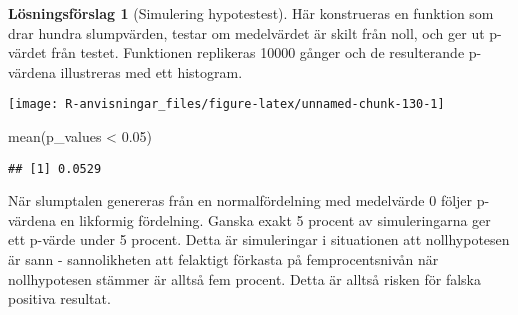 \documentclass[
]{book}
\newenvironment{Shaded}{\begin{snugshade}}{\end{snugshade}}
\newcommand{\AttributeTok}[1]{\textcolor[rgb]{0.77,0.63,0.00}{#1}}
\newcommand{\ControlFlowTok}[1]{\textcolor[rgb]{0.13,0.29,0.53}{\textbf{#1}}}
\newcommand{\DecValTok}[1]{\textcolor[rgb]{0.00,0.00,0.81}{#1}}
\newcommand{\FloatTok}[1]{\textcolor[rgb]{0.00,0.00,0.81}{#1}}
\newcommand{\FunctionTok}[1]{\textcolor[rgb]{0.00,0.00,0.00}{#1}}
\newcommand{\NormalTok}[1]{#1}
\newcommand{\OtherTok}[1]{\textcolor[rgb]{0.56,0.35,0.01}{#1}}
\newcommand{\SpecialCharTok}[1]{\textcolor[rgb]{0.00,0.00,0.00}{#1}}
\theoremstyle{definition}
\theoremstyle{definition}
\theoremstyle{definition}
\theoremstyle{definition}
\newtheorem{hypothesis}{Lösningsförslag}[chapter]
\theoremstyle{remark}
\begin{document}
\begin{hypothesis}[Simulering hypotestest]
Här konstrueras en funktion som drar hundra slumpvärden, testar om medelvärdet är skilt från noll, och ger ut p-värdet från testet. Funktionen replikeras 10000 gånger och de resulterande p-värdena illustreras med ett histogram.

\begin{Shaded}
\end{Shaded}

\begin{center}\texttt{[image: R-anvisningar\_files/figure-latex/unnamed-chunk-130-1]} \end{center}

\begin{Shaded}
\begin{Highlighting}[]
\FunctionTok{mean}\NormalTok{(p\_values }\SpecialCharTok{\textless{}} \FloatTok{0.05}\NormalTok{)}
\end{Highlighting}
\end{Shaded}

\begin{verbatim}
## [1] 0.0529
\end{verbatim}

När slumptalen genereras från en normalfördelning med medelvärde 0 följer p-värdena en likformig fördelning. Ganska exakt 5 procent av simuleringarna ger ett p-värde under 5 procent. Detta är simuleringar i situationen att nollhypotesen är sann - sannolikheten att felaktigt förkasta på femprocentsnivån när nollhypotesen stämmer är alltså fem procent. Detta är alltså risken för falska positiva resultat.


\end{hypothesis}
\end{document}
